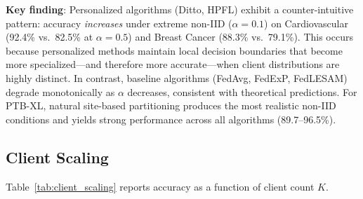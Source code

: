 \documentclass[conference]{IEEEtran}
\begin{document}
\textbf{Key finding}: Personalized algorithms (Ditto, HPFL) exhibit a counter-intuitive pattern: accuracy \textit{increases} under extreme non-IID ($\alpha{=}0.1$) on Cardiovascular (92.4\% vs.\ 82.5\% at $\alpha{=}0.5$) and Breast Cancer (88.3\% vs.\ 79.1\%). This occurs because personalized methods maintain local decision boundaries that become more specialized---and therefore more accurate---when client distributions are highly distinct. In contrast, baseline algorithms (FedAvg, FedExP, FedLESAM) degrade monotonically as $\alpha$ decreases, consistent with theoretical predictions. For PTB-XL, natural site-based partitioning produces the most realistic non-IID conditions and yields strong performance across all algorithms (89.7--96.5\%).

\subsection{Client Scaling}

Table~\ref{tab:client_scaling} reports accuracy as a function of client count $K$.
\end{document}
